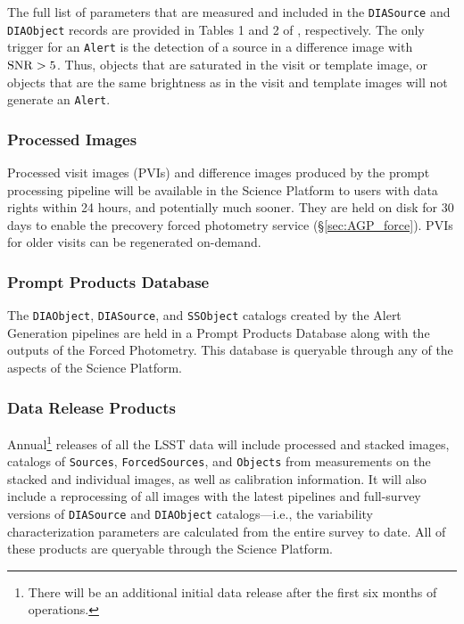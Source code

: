 The full list of parameters that are measured and included in the {\tt DIASource} and {\tt DIAObject} records are provided in Tables 1 and 2 of , respectively.
The only trigger for an {\tt Alert} is the detection of a source in a difference image with ${\rm SNR} > 5$. 
Thus, objects that are saturated in the visit or template image, or objects that are the same brightness as in the visit and template images will not generate an {\tt Alert}.

\subsubsection{Processed Images} \label{sec:products}

Processed visit images (PVIs) and difference images produced by the prompt processing pipeline will be available in the Science Platform to users with data rights within 24 hours, and potentially much sooner.
They are held on disk for 30 days to enable the precovery forced photometry service (\S \ref{sec:AGP_force}).
PVIs for older visits can be regenerated on-demand.

\subsubsection{Prompt Products Database} \label{sec:ppdb}

The \texttt{DIAObject}, \texttt{DIASource}, and \texttt{SSObject} catalogs created by the Alert Generation pipelines are held in a Prompt Products Database along with the outputs of the Forced Photometry.
This database is queryable through any of the aspects of the Science Platform.


\subsubsection{Data Release Products} \label{sec:drp}

Annual\footnote{There will be an additional initial data release after the first six months of operations.}  releases of all the LSST data will include processed and stacked images, catalogs of {\tt Sources}, {\tt ForcedSources}, and {\tt Objects} from measurements on the stacked and individual images, as well as calibration information.
It will also include a  reprocessing of all images with the latest pipelines and full-survey versions of {\tt DIASource} and {\tt DIAObject} catalogs---i.e., the variability characterization parameters are calculated from the entire survey to date.
All of these products are queryable through the Science Platform.

